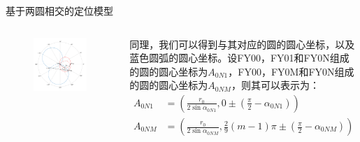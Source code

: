 \documentclass[aspectratio=169]{beamer}
\begin{document}
\begin{frame}{基于两圆相交的定位模型}
    \begin{columns}
        \begin{figure}[!ht]
            \centering
            \includegraphics[width=\textwidth]{图片/问题1-1示意图.pdf}
        \end{figure}
        同理，我们可以得到与其对应的圆的圆心坐标，以及蓝色圆弧的圆心坐标。设FY00，FY01和FY0N组成的圆的圆心坐标为$A_{0N1}$，FY00，FY0M和FY0N组成的圆的圆心坐标为$A_{0NM}$，则其可以表示为：
        \begin{align}
            A_{0N1} &= \left(\frac{r_0}{2\sin \alpha_{0N1}}, 0 \pm \left(\frac{\pi}{2} - \alpha_{0N1}\right)\right)\\
            A_{0NM} &= \left(\frac{r_0}{2\sin \alpha_{0NM}}, \frac{2}{9}\left(m-1\right)\pi \pm \left(\frac{\pi}{2} - \alpha_{0NM}\right)\right)\label{eq:0NM圆心坐标}
        \end{align}
    \end{columns}
\end{frame}
\end{document}
